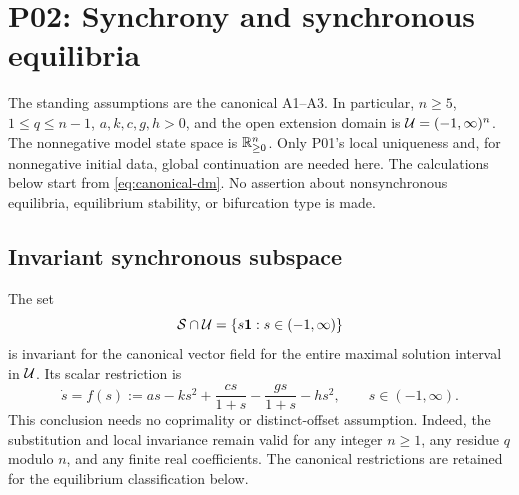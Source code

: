 \section{P02: Synchrony and synchronous equilibria}
\label{sec:P02}

The standing assumptions are the canonical A1--A3. In particular,
$n\ge5$, $1\le q\le n-1$, $a,k,c,g,h>0$, and the open extension
domain is $\mathcal{U}=(-1,\infty)^n$. The nonnegative model state space
is $\mathbb{R}_{\geq 0}^{n}$. Only P01's local uniqueness and, for nonnegative initial data, global continuation are needed here.
The calculations below start from \eqref{eq:canonical-dm}.
No assertion about nonsynchronous equilibria, equilibrium stability,
or bifurcation type is made.

\subsection{Invariant synchronous subspace}
\label{slot:P02-1}

\begin{proposition}
\label{prop:P02-invariance}
The set
\[
 \mathcal{S}\cap\mathcal{U}=\{s\mathbf{1}:s\in(-1,\infty)\}
\]
is invariant for the canonical vector field for the entire maximal
solution interval in $\mathcal{U}$. Its scalar restriction is
\begin{equation}
\label{eq:P02-scalar-original}
 \dot s=f(s):=as-ks^2+\frac{cs}{1+s}
                     -\frac{gs}{1+s}-hs^2,
 \qquad s\in(-1,\infty).
\end{equation}
This conclusion needs no coprimality or distinct-offset assumption.
Indeed, the substitution and local invariance remain valid for any
integer $n\ge1$, any residue $q$ modulo $n$, and any finite real
coefficients. The canonical restrictions are retained for the
equilibrium classification below.
\end{proposition}

